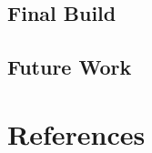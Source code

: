 \documentclass{article}
\begin{document}
\subsection{Final Build}

\subsection{Future Work}




\pagebreak
\section{References}



\end{document}
